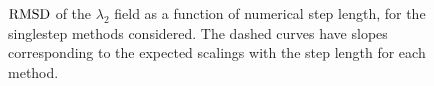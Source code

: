 \begin{figure}[htpb]
    \centering
    
    \caption[$\rmsd$ of the $\lambda_{2}$ field as a function of numerical
    step length, for the singlestep methods considered]{
    $\rmsd$ of the $\lambda_{2}$ field as a function of numerical step length,
    for the singlestep methods considered. The dashed curves have slopes
    corresponding to the expected scalings with the step length for each method.}
    \label{fig:lmbd2_err_fixed}
\end{figure}
